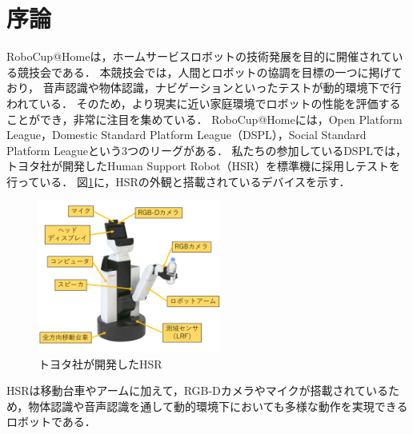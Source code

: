 \documentclass[a4j]{jarticle}
\begin{document}
\maketitle
\thispagestyle{empty}


\section{序論}
RoboCup@Home\cite{robocup_hp}は，ホームサービスロボットの技術発展を目的に開催されている競技会である．
本競技会では，人間とロボットの協調を目標の一つに掲げており，
音声認識や物体認識，ナビゲーションといったテストが動的環境下で行われている．
そのため，より現実に近い家庭環境でロボットの性能を評価することができ，非常に注目を集めている．
RoboCup@Homeには，Open Platform League，Domestic Standard Platform League（DSPL），Social Standard Platform Leagueという3つのリーグがある．
私たちの参加しているDSPLでは，トヨタ社が開発したHuman Support Robot（HSR）\cite{hsr_paper}を標準機に採用しテストを行っている．
図\ref{overview_hsr}に，HSRの外観と搭載されているデバイスを示す．
\begin{figure}[ht]
  \centering
  \includegraphics[width=6cm]{images/hsr/hsr_explain_ja.png}
  \caption{トヨタ社が開発したHSR}
  \label{overview_hsr}
\end{figure}
HSRは移動台車やアームに加えて，RGB-Dカメラやマイクが搭載されているため，物体認識や音声認識を通して動的環境下においても多様な動作を実現できるロボットである．
\end{document}
